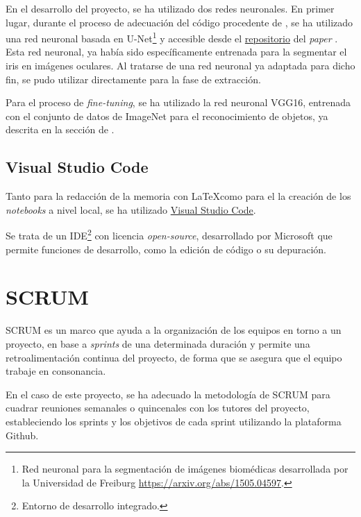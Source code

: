 En el desarrollo del proyecto, se ha utilizado dos redes neuronales. En primer lugar, durante el proceso de adecuación del código procedente de \cite{tfg_iris_2020}, se ha utilizado una red neuronal basada en U-Net\footnote{Red neuronal para la segmentación de imágenes biomédicas desarrollada por la Universidad de Freiburg \url{https://arxiv.org/abs/1505.04597}.} y accesible desde el \href{https://github.com/jus390/U-net-Iris-segmentation}{repositorio} del \textit{paper} \cite{lozej_end--end_2018}. Esta red neuronal, ya había sido
específicamente entrenada para la segmentar el iris en imágenes oculares. Al tratarse de una red neuronal ya adaptada para dicho fin, se pudo utilizar directamente para la fase de extracción.

Para el proceso de \textit{fine-tuning}, se ha utilizado la red neuronal VGG16, entrenada con el conjunto de datos de ImageNet para el reconocimiento de objetos, ya descrita en la sección de .

\subsection{Visual Studio Code}

Tanto para la redacción de la memoria con \LaTeX como para el la creación de los \textit{notebooks} a nivel local, se ha utilizado \href{https://code.visualstudio.com/}{Visual Studio Code}.

Se trata de un IDE\footnote{Entorno de desarrollo integrado.} con licencia \textit{open-source}, desarrollado por Microsoft que permite funciones de desarrollo, como la edición de código o su depuración.

\section{SCRUM}
SCRUM es un marco que ayuda a la organización de los equipos en torno a un proyecto, en base a \textit{sprints} de una determinada duración y permite una retroalimentación
continua del proyecto, de forma que se asegura que el equipo trabaje en consonancia.

En el caso de este proyecto, se ha adecuado la metodología de SCRUM para cuadrar reuniones semanales o quincenales con los tutores del proyecto, estableciendo
los sprints y los objetivos de cada sprint utilizando la plataforma Github.





